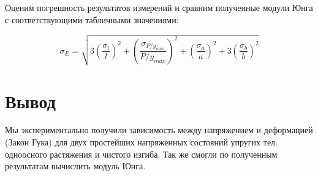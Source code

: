 \documentclass[a4paper, 12pt]{article}%
\begin{document}
Оценим погрешность результатов измерений и сравним полученные модули Юнга с соответствующими табличными значениями:


\[\sigma_E = \sqrt{3 \left( \dfrac{\sigma_{l}}{l} \right)^2 + \left( \dfrac{\sigma_{P/y_{max}}}{P/y_{max}} \right)^2 + \left( \dfrac{\sigma_{a}}{a} \right)^2 + 3 \left( \dfrac{\sigma_{b}}{b} \right)^2}\]

\section{Вывод}

Мы экспериментально получили зависимость между напряжением и деформацией (Закон Гука) для двух простейших напряженных состояний упругих тел: одноосного растяжения и чистого изгиба. Так же смогли по полученным результатам вычислить модуль Юнга.
\end{document}
